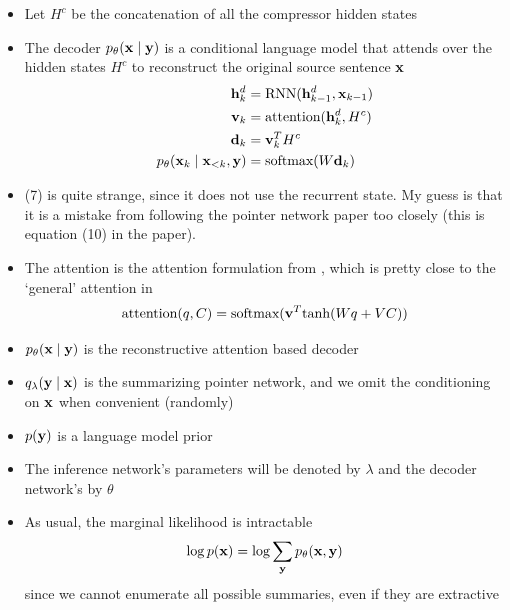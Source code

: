 \begin{frame}
\begin{center}
\end{center}
\begin{itemize}
\item Let $H^c$ be the concatenation of all the compressor hidden states
\item The decoder $p_\theta(\mathbf{x}\mid\mathbf{y})$
is a conditional language model that attends over the hidden states $H^c$ 
to reconstruct the original source sentence $\mathbf{x}$
\begin{align}
\mathbf{h}_k^d &= \textrm{RNN}(\mathbf{h}_{k-1}^d, \mathbf{x}_{k-1})\\
\mathbf{v}_k &= \textrm{attention}(\mathbf{h}_k^d, H^c)\\
\mathbf{d}_k &= \mathbf{v}_k^TH^c\\
p_\theta(\mathbf{x}_k\mid\mathbf{x}_{<k}, \mathbf{y}) &= \textrm{softmax}(W \mathbf{d}_k)
\end{align}
\item (7) is quite strange, since it does not use the recurrent state.
My guess is that it is a mistake from following the pointer network
paper too closely (this is equation (10) in the paper).
\end{itemize}
\end{frame}

\begin{frame}
\begin{center}
\end{center}
\begin{itemize}
\item The attention is the attention formulation from \cite{Vinyals2015a},
which is pretty close to the `general' attention in \cite{Luong2015}
\begin{equation}
\textrm{attention}(q, C) = \textrm{softmax}(\mathbf{v}^T\textrm{tanh}(Wq + VC))
\end{equation}
\item $p_\theta(\mathbf{x}\mid\mathbf{y})$ is the reconstructive attention based decoder
\item $q_\lambda(\mathbf{y}\mid\mathbf{x})$ is the summarizing pointer network,
and we omit the conditioning on $\mathbf{x}$ when convenient (randomly)
\item $p(\mathbf{y})$ is a language model prior
\end{itemize}
\end{frame}

\begin{frame}
\begin{center}
\end{center}
\begin{itemize}
\item The inference network's parameters will be denoted by $\lambda$
and the decoder network's by $\theta$
\item As usual, the marginal likelihood is intractable
\begin{equation}
\log p(\mathbf{x}) = \log \sum_{\mathbf{y}} p_\theta(\mathbf{x}, \mathbf{y})
\end{equation}
since we cannot enumerate all possible summaries, even if they are extractive
\end{itemize}
\end{frame}

